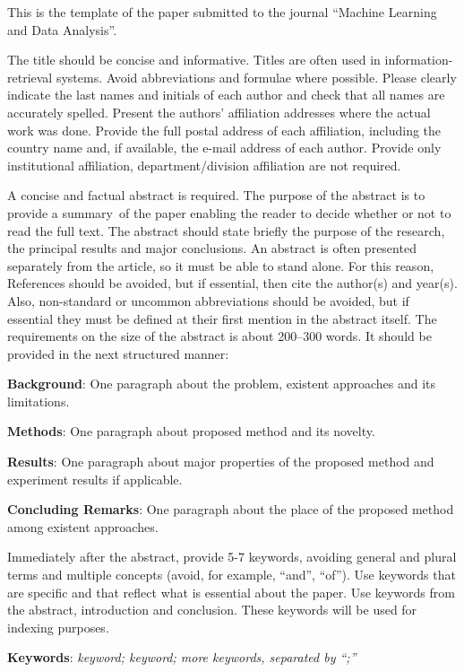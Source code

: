 \documentclass[12pt, twoside]{article}
\begin{document}
    {This is the template of the paper submitted to the journal ``Machine Learning and Data Analysis''.
		
	\noindent
	The title should be concise and informative. Titles are often used in information-retrieval systems. Avoid abbreviations and formulae where possible.
	Please clearly indicate the last names and initials of each author and check that all names are accurately spelled. Present the authors' affiliation addresses where the actual work was done.
	Provide the full postal address of each affiliation, including the country name and, if available, the
	e-mail address of each author.
	Provide only institutional affiliation, department/division affiliation are not required.

	\noindent
	A concise and factual abstract is required.
	The purpose of the abstract is to provide a summary~of the paper enabling the reader to decide whether or not to read the full text.
    	The abstract should state briefly the purpose of the research, the principal results and major conclusions.
    	An abstract is often presented separately from the article, so it must be able to stand alone.
    	For this reason, References should be avoided, but if essential, then cite the author(s) and year(s).
    	Also, non-standard or uncommon abbreviations should be avoided, but if essential they must be defined at their first mention in the abstract itself.
    	The requirements on the size of the abstract is about 200--300 words.
    	It should be provided in the next structured manner:
	
	\noindent
	\textbf{Background}:	One paragraph about the problem, existent approaches and its limitations.
	
	\noindent
	\textbf{Methods}: One paragraph about proposed method and its novelty.
	
	\noindent
	\textbf{Results}: One paragraph about major properties of the proposed method and experiment results if applicable.
	
	\noindent
	\textbf{Concluding Remarks}: One paragraph about the place of the proposed method among existent approaches.
		
	\noindent
	Immediately after the abstract, provide 5-7 keywords, avoiding general and plural terms and multiple concepts (avoid, for example, ``and'', ``of'').
	Use keywords that are specific and that reflect what is essential about the paper.
	Use keywords from the abstract, introduction and conclusion.
	These keywords will be used for indexing purposes.
		
	\noindent
    	\textbf{Keywords}: \emph{keyword; keyword; more keywords, separated by ``;''}}
\end{document}
